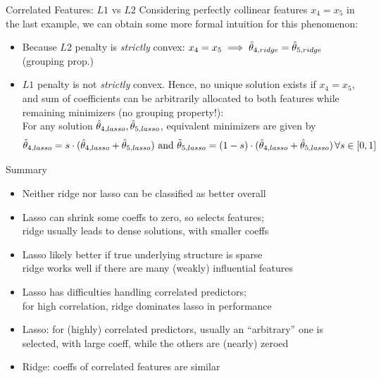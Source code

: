 \documentclass[11pt,compress,t,notes=noshow, xcolor=table]{beamer}
\begin{document}
\begin{vbframe}{Correlated Features: $L1$ vs $L2$}
Considering perfectly collinear features $x_4=x_5$ in the last example, we can obtain some more formal intuition for this phenomenon:
\vspace{0.15cm}
\begin{itemize}
    \item Because $L2$ penalty is \textit{strictly} convex: $x_4=x_5 \implies \hat{\theta}_{4, ridge}=\hat{\theta}_{5, ridge}$ (grouping prop.)
    \item $L1$ penalty is not \textit{strictly} convex. Hence, no unique solution exists if $x_4=x_5$, and sum of coefficients can be arbitrarily allocated to both features while remaining minimizers (no grouping property!):\\
    For any solution $\hat{\theta}_{4,lasso},\hat{\theta}_{5,lasso}$, equivalent minimizers are given by 
    \vspace{-0.1cm}
    {\footnotesize $$\Tilde{\theta}_{4,lasso}=s\cdot(\hat{\theta}_{4,lasso}+\hat{\theta}_{5,lasso}) \,\,\text{and}\,\,\Tilde{\theta}_{5,lasso}=(1-s)\cdot(\hat{\theta}_{4,lasso}+\hat{\theta}_{5,lasso})\,\forall s\in[0,1]$$}
\end{itemize}

\framebreak



\end{vbframe}


\begin{vbframe}{Summary  }

\begin{itemize}
\item Neither ridge nor lasso can be classified as better overall
\item Lasso can shrink some coeffs to zero, so selects features; \\
ridge usually leads to dense solutions, with smaller coeffs
\item Lasso likely better if true underlying structure is sparse \\
ridge works well if there are many (weakly) influential features
\item Lasso has difficulties handling correlated predictors; \\
for high correlation, ridge dominates lasso in performance
\item Lasso: for (highly) correlated predictors, usually an ``arbitrary'' one is selected, with large coeff, while the others are (nearly) zeroed
\item Ridge: coeffs of correlated features are similar
\end{itemize}

\end{vbframe}

\endlecture
\end{document}
